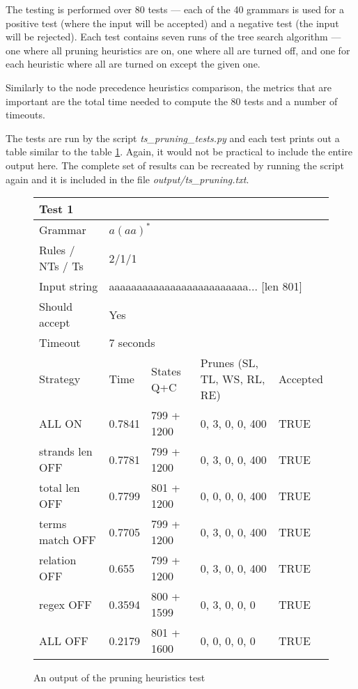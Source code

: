The testing is performed over 80 tests --- each of the 40 grammars is used for a positive test (where the input will be accepted) and a negative test (the input will be rejected).
Each test contains seven runs of the tree search algorithm --- one where all pruning heuristics are on, one where all are turned off, and one for each heuristic where all are turned on except the given one.

Similarly to the node precedence heuristics comparison, the metrics that are important are the total time needed to compute the 80 tests and a number of timeouts.

The tests are run by the script \textit{ts\_pruning\_tests.py} and each test prints out a table similar to the table \ref{tab:prune_heuristics_table}. Again, it would not be practical to include the entire output here. The complete set of results can be recreated by running the script again and it is included in the file \textit{output/ts\_pruning.txt}.

\begin{figure}[h]
  \caption{An output of the pruning heuristics test}
  \label{tab:prune_heuristics_table}
\begin{tabular}{ |l|l|l|l|l|  }
  \hline
  \multicolumn{5}{|l|}{Test 1} \\
  \hline
  Grammar & \multicolumn{4}{|l|}{$a(aa)^*$} \\
  Rules / NTs / Ts & \multicolumn{4}{|l|}{2/1/1} \\
  Input string & \multicolumn{4}{|l|}{aaaaaaaaaaaaaaaaaaaaaaaaa... [len 801]} \\
  Should accept & \multicolumn{4}{|l|}{Yes} \\
  Timeout & \multicolumn{4}{|l|}{7 seconds} \\
  \hline
  Strategy & Time & States Q+C & Prunes (SL, TL, WS, RL, RE)& Accepted \\
  \hline
  ALL ON & 0.7841 & 799 + 1200 & 0, 3, 0, 0, 400 & TRUE \\
  strands len OFF & 0.7781 & 799 + 1200 & 0, 3, 0, 0, 400 & TRUE \\
  total len OFF & 0.7799 & 801 + 1200 & 0, 0, 0, 0, 400 & TRUE \\
  terms match OFF & 0.7705 & 799 + 1200 & 0, 3, 0, 0, 400 & TRUE \\
  relation OFF & 0.655 & 799 + 1200 & 0, 3, 0, 0, 400 & TRUE \\
  regex OFF & 0.3594 & 800 + 1599 & 0, 3, 0, 0, 0 & TRUE \\
  ALL OFF & 0.2179 & 801 + 1600 & 0, 0, 0, 0, 0 & TRUE \\
  \hline
  \hline
\end{tabular}
\end{figure}

